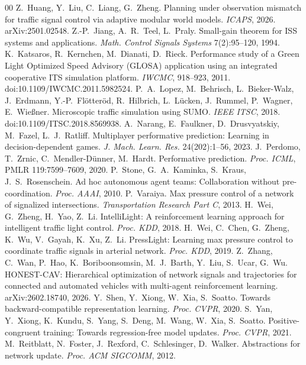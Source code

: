 \begin{thebibliography}{00}
 Z.~Huang, Y.~Liu, C.~Liang, G.~Zheng. Planning under observation mismatch for traffic signal control via adaptive modular world models. \emph{ICAPS}, 2026. arXiv:2501.02548.
 Z.-P.~Jiang, A.~R.~Teel, L.~Praly. Small-gain theorem for ISS systems and applications. \emph{Math. Control Signals Systems} 7(2):95--120, 1994.
 K.~Katsaros, R.~Kernchen, M.~Dianati, D.~Rieck. Performance study of a Green Light Optimized Speed Advisory (GLOSA) application using an integrated cooperative ITS simulation platform. \emph{IWCMC}, 918--923, 2011. doi:10.1109/IWCMC.2011.5982524.
 P.~A.~Lopez, M.~Behrisch, L.~Bieker-Walz, J.~Erdmann, Y.-P.~Fl\"otter\"od, R.~Hilbrich, L.~L\"ucken, J.~Rummel, P.~Wagner, E.~Wie{\ss}ner. Microscopic traffic simulation using SUMO. \emph{IEEE ITSC}, 2018. doi:10.1109/ITSC.2018.8569938.
 A.~Narang, E.~Faulkner, D.~Drusvyatskiy, M.~Fazel, L.~J.~Ratliff. Multiplayer performative prediction: Learning in decision-dependent games. \emph{J. Mach. Learn. Res.} 24(202):1--56, 2023.
 J.~Perdomo, T.~Zrnic, C.~Mendler-D\"unner, M.~Hardt. Performative prediction. \emph{Proc. ICML}, PMLR 119:7599--7609, 2020.
 P.~Stone, G.~A.~Kaminka, S.~Kraus, J.~S.~Rosenschein. Ad hoc autonomous agent teams: Collaboration without pre-coordination. \emph{Proc. AAAI}, 2010.
 P.~Varaiya. Max pressure control of a network of signalized intersections. \emph{Transportation Research Part C}, 2013.
 H.~Wei, G.~Zheng, H.~Yao, Z.~Li. IntelliLight: A reinforcement learning approach for intelligent traffic light control. \emph{Proc. KDD}, 2018.
 H.~Wei, C.~Chen, G.~Zheng, K.~Wu, V.~Gayah, K.~Xu, Z.~Li. PressLight: Learning max pressure control to coordinate traffic signals in arterial network. \emph{Proc. KDD}, 2019.
 Z.~Zhang, C.~Wan, P.~Hao, K.~Boriboonsomsin, M.~J.~Barth, Y.~Liu, S.~Ucar, G.~Wu. HONEST-CAV: Hierarchical optimization of network signals and trajectories for connected and automated vehicles with multi-agent reinforcement learning. arXiv:2602.18740, 2026.
 Y.~Shen, Y.~Xiong, W.~Xia, S.~Soatto. Towards backward-compatible representation learning. \emph{Proc. CVPR}, 2020.
 S.~Yan, Y.~Xiong, K.~Kundu, S.~Yang, S.~Deng, M.~Wang, W.~Xia, S.~Soatto. Positive-congruent training: Towards regression-free model updates. \emph{Proc. CVPR}, 2021.
 M.~Reitblatt, N.~Foster, J.~Rexford, C.~Schlesinger, D.~Walker. Abstractions for network update. \emph{Proc. ACM SIGCOMM}, 2012.

\end{thebibliography}
